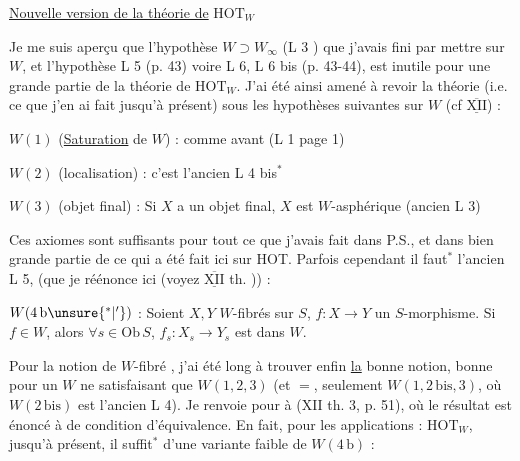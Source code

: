 
\uline{Nouvelle version de la théorie de} $\mathrm{HOT}_W$

Je me suis aperçu que l'hypothèse $W\supset W_\infty$ (L 3 ) que j'avais fini par mettre sur $W$,  et  l'hypothèse L 5 (p. 43) voire L 6, L 6 bis (p. 43-44), est inutile pour une grande partie de la théorie de $\mathrm{HOT}_W$. J'ai été ainsi amené à revoir la théorie (i.e. ce que j'en ai fait jusqu'à présent) sous les hypothèses suivantes sur $W$ (cf $\overline{\underline{\mathrm{XII}}}$) :

$W(1)$ (\uline{Saturation} de $W$) : comme avant (L 1 page 1)

$W(2)$ (localisation) : c'est l'ancien L 4 bis$^*$

$W(3)$ (objet final) : Si $X$ a un objet final, $X$ est $W$-asphérique (ancien L 3)


Ces   axiomes sont suffisants pour tout ce que j'avais fait dans P.S., et dans bien grande partie de ce qui a été fait ici sur HOT. Parfois cependant il faut$^*$ l'ancien L 5, (que je réénonce ici (voyez $\overline{\underline{\mathrm{XII}}}$ th. )) :

$W(4\,\mathrm b\unsure{{}^*|{}'})$ : Soient $X,Y$ $W$-fibrés sur $S$, $f:X\longrightarrow Y$ un $S$-morphisme. Si $f\in W$, alors $\forall s\in\mathrm{Ob}\,S$, $f_s:X_s\longrightarrow Y_s$ est dans $W$.

Pour la notion de $W$-fibré , j'ai été long à trouver enfin \uline{la} bonne notion,  bonne pour un $W$ ne satisfaisant que $W(1,2,3)$ (et $=$, seulement $W(1,2\,\mathrm{bis},3)$, où $W(2\,\mathrm{bis})$ est l'ancien L 4). Je renvoie pour  à (XII th. 3, p. 51), où le  résultat est énoncé à  de condition d'équivalence. En fait, pour les applications  : $\mathrm{HOT}_W$,  jusqu'à présent, il suffit$^*$ d'une variante faible de $W(4\,\mathrm b)$ :

